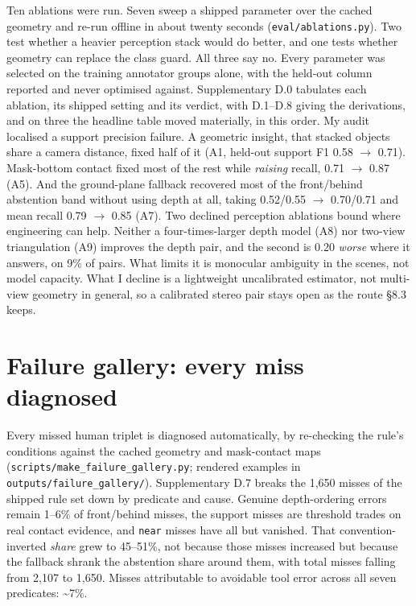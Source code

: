 Ten ablations were run. Seven sweep a shipped parameter over the cached geometry and re-run offline in about twenty seconds (\texttt{eval/ablations.py}). Two test whether a heavier perception stack would do better, and one tests whether geometry can replace the class guard. All three say no. Every parameter was selected on the training annotator groups alone, with the held-out column reported and never optimised against. Supplementary D.0 tabulates each ablation, its shipped setting and its verdict, with D.1--D.8 giving the derivations, and on three the headline table moved materially, in this order. My audit localised a support precision failure. A geometric insight, that stacked objects share a camera distance, fixed half of it (A1, held-out support F1 0.58 $\rightarrow$ 0.71). Mask-bottom contact fixed most of the rest while \textit{raising} recall, 0.71 $\rightarrow$ 0.87 (A5). And the ground-plane fallback recovered most of the front/behind abstention band without using depth at all, taking 0.52/0.55 $\rightarrow$ 0.70/0.71 and mean recall 0.79 $\rightarrow$ 0.85 (A7). Two declined perception ablations bound where engineering can help. Neither a four-times-larger depth model (A8) nor two-view triangulation (A9) improves the depth pair, and the second is 0.20 \textit{worse} where it answers, on 9\% of pairs. What limits it is monocular ambiguity in the scenes, not model capacity. What I decline is a lightweight uncalibrated estimator, not multi-view geometry in general, so a calibrated stereo pair stays open as the route \S{}8.3 keeps.

\section{Failure gallery: every miss diagnosed}

Every missed human triplet is diagnosed automatically, by re-checking the rule's conditions against the cached geometry and mask-contact maps (\texttt{scripts/make\_\allowbreak{}failure\_\allowbreak{}gallery.py}; rendered examples in \texttt{outputs/failure\_\allowbreak{}gallery/}). Supplementary D.7 breaks the 1,650 misses of the shipped rule set down by predicate and cause. Genuine depth-ordering errors remain 1--6\% of front/behind misses, the support misses are threshold trades on real contact evidence, and \texttt{near} misses have all but vanished. That convention-inverted \textit{share} grew to 45--51\%, not because those misses increased but because the fallback shrank the abstention share around them, with total misses falling from 2,107 to 1,650. Misses attributable to avoidable tool error across all seven predicates: \textasciitilde{}7\%.

